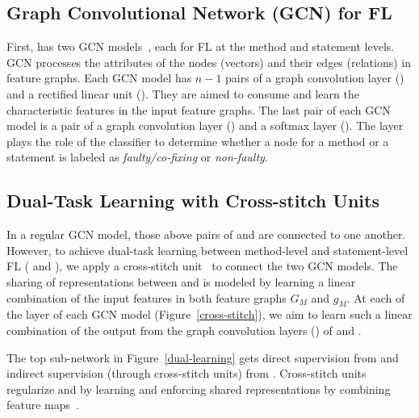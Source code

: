 

\subsection{\bf Graph Convolutional Network (GCN) for FL}

First, {\tool} has two GCN models~\cite{kipf2016semi}, each for FL at
the method and statement levels. GCN processes the attributes of the
nodes (vectors) and their edges (relations) in feature graphs. Each
GCN model has $n-1$ pairs of a graph convolution layer ()
and a rectified linear unit (). They are aimed to consume
and learn the characteristic features in the input feature graphs. The
last pair of each GCN model is a pair of a graph convolution layer
() and a softmax layer (). The 
layer plays the role of the classifier to determine whether a node for
a method or a statement is labeled as {\em faulty/co-fixing} or {\em
  non-faulty}.

\subsection{\bf Dual-Task Learning with Cross-stitch Units}


In a regular GCN model, those above pairs of  and
 are connected to one another. However, to achieve
dual-task learning between method-level and statement-level FL
( and ), we apply a cross-stitch
unit~\cite{misra2016cross} to connect the two GCN models. The sharing
of representations between  and  is modeled
by learning a linear combination of the input features in both feature
graphs $G_M$ and $g_M$. At each of the  layer of each GCN
model (Figure~\ref{cross-stitch}), we aim to learn such a linear
combination of the output from the graph convolution layers
() of  and .

The top sub-network in Figure~\ref{dual-learning} gets direct
supervision from  and indirect supervision (through
cross-stitch units) from . Cross-stitch units regularize
 and  by learning and enforcing shared
representations by combining feature maps~\cite{misra2016cross}.


